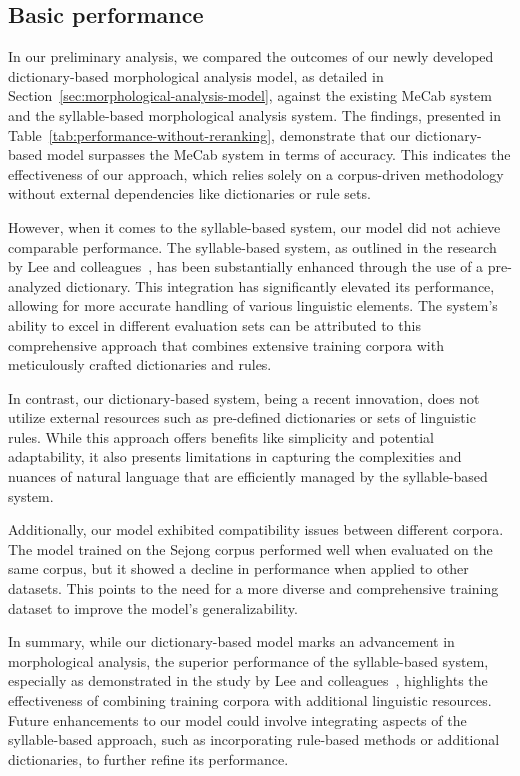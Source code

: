 \documentclass[AMS,STIX2COL]{WileyNJD-v2}
\begin{document}
    \subsection{Basic performance}\label{subsec:basic-performance}

    In our preliminary analysis, we compared the outcomes of our newly developed dictionary-based morphological analysis model, as detailed in Section~\ref{sec:morphological-analysis-model}, against the existing MeCab system and the syllable-based morphological analysis system.
    The findings, presented in Table~\ref{tab:performance-without-reranking}, demonstrate that our dictionary-based model surpasses the MeCab system in terms of accuracy.
    This indicates the effectiveness of our approach, which relies solely on a corpus-driven methodology without external dependencies like dictionaries or rule sets.

    However, when it comes to the syllable-based system, our model did not achieve comparable performance.
    The syllable-based system, as outlined in the research by Lee and colleagues~\cite{LeeCH2016}, has been substantially enhanced through the use of a pre-analyzed dictionary.
    This integration has significantly elevated its performance, allowing for more accurate handling of various linguistic elements.
    The system's ability to excel in different evaluation sets can be attributed to this comprehensive approach that combines extensive training corpora with meticulously crafted dictionaries and rules.

    In contrast, our dictionary-based system, being a recent innovation, does not utilize external resources such as pre-defined dictionaries or sets of linguistic rules.
    While this approach offers benefits like simplicity and potential adaptability, it also presents limitations in capturing the complexities and nuances of natural language that are efficiently managed by the syllable-based system.

    Additionally, our model exhibited compatibility issues between different corpora.
    The model trained on the Sejong corpus performed well when evaluated on the same corpus, but it showed a decline in performance when applied to other datasets.
    This points to the need for a more diverse and comprehensive training dataset to improve the model's generalizability.

    In summary, while our dictionary-based model marks an advancement in morphological analysis, the superior performance of the syllable-based system, especially as demonstrated in the study by Lee and colleagues~\cite{LeeCH2016}, highlights the effectiveness of combining training corpora with additional linguistic resources.
    Future enhancements to our model could involve integrating aspects of the syllable-based approach, such as incorporating rule-based methods or additional dictionaries, to further refine its performance.
\end{document}
